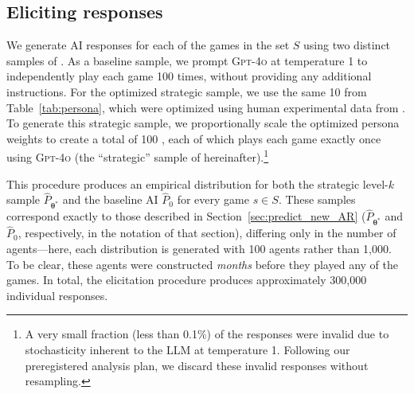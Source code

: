 \subsection{Eliciting \aisub{} responses}

We generate AI responses for each of the \NGamesS{} games in the set $S$ using two distinct samples of . 
As a baseline sample, we prompt \textsc{Gpt-4o} at temperature 1 to independently play each game 100 times, without providing any additional instructions. 
For the optimized strategic sample, we use the same 10  from Table~\ref{tab:persona}, which were optimized using human experimental data from \citeauthor{1120Arad2012}. 
To generate this strategic sample, we proportionally scale the optimized persona weights to create a total of 100 , each of which plays each game exactly once using \textsc{Gpt-4o} (the ``strategic'' sample of  hereinafter).\footnote{A very small fraction (less than 0.1\%) of the \aisub{} responses were invalid due to stochasticity inherent to the LLM at temperature 1. Following our preregistered analysis plan, we discard these invalid responses without resampling.}

This procedure produces an empirical distribution for both the strategic level-$k$ sample $\hat P_{\bm\theta^*}$ and the baseline AI $\hat P_{0}$ for every game $s \in S$.
These samples correspond exactly to those described in Section~\ref{sec:predict_new_AR} ($\hat P_{\bm\theta^*}$ and $\hat P_{0}$, respectively, in the notation of that section), differing only in the number of agents---here, each distribution is generated with 100 agents rather than 1,000.
To be clear, these agents were constructed \emph{months} before they played any of the \NGamesS{} games.
In total, the elicitation procedure produces approximately 300,000 individual \aisub{} responses.
